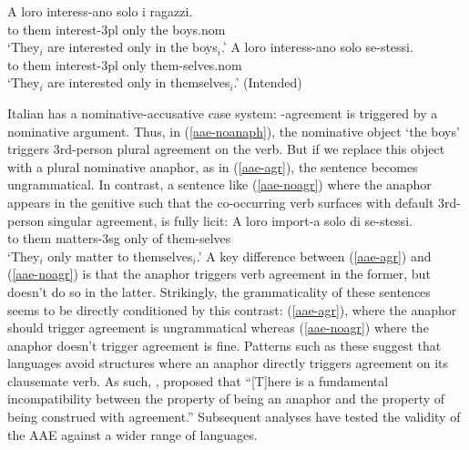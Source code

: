 \documentclass[output=paper, modfonts, nonflat]{langsci/langscibook}
\begin{document}
\ea\label{aae-noanaph}\gll A loro interess-ano solo i ragazzi.\\
to them interest-{\sc 3pl} only the boys.{\sc nom}\\
\glt `They$_i$ are interested only in the boys$_i$.'
\ex\label{aae-agr}\gll *A loro interess-ano solo se-stessi.\\
to them interest-{\sc 3pl} only them-selves.{\sc nom}\\
\glt `They$_i$ are interested only in themselves$_i$.'  (Intended) \z

\noindent Italian has a nominative-accusative case system: \ph-agreement is
triggered by a nominative argument.  Thus, in (\ref{aae-noanaph}), the
nominative object `the boys' triggers 3rd-person plural agreement on
the verb. But if we replace this object with a plural nominative
anaphor, as in (\ref{aae-agr}), the sentence becomes ungrammatical. In
contrast, a sentence like (\ref{aae-noagr}) \citep[][33]{rizzi:1990}
where the anaphor appears in the genitive such that the co-occurring
verb surfaces with default 3rd-person singular agreement, is fully
licit:
   \ea\label{aae-noagr}\gll A loro import-a solo di se-stessi.\\
  to them matters-{\sc 3sg} only of them-selves\\
  \glt `They$_i$ only matter to themselves$_i$.'
\z
A key difference between (\ref{aae-agr}) and (\ref{aae-noagr}) is that
the anaphor triggers verb agreement in the former, but doesn't do so
in the latter. Strikingly, the grammaticality of these sentences seems
to be directly conditioned by this contrast: (\ref{aae-agr}), where
the anaphor should trigger agreement is ungrammatical whereas
(\ref{aae-noagr}) where the anaphor doesn't trigger agreement is
fine. Patterns such as these suggest that languages avoid structures
where an anaphor directly triggers agreement on its clausemate
verb. As such, \citet[28]{rizzi:1990}, proposed that ``[T]here is a
fundamental incompatibility between the property of being an anaphor
and the property of being construed with agreement.'' Subsequent
analyses \citep{woolford:1999, haegeman:2004, tucker:2011}
have tested the validity of the AAE against a wider range of
languages.
\end{document}
